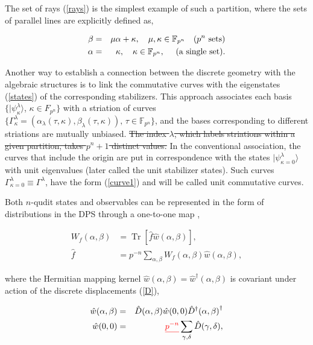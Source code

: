 \documentclass[quantumrep,article,submit,pdftex,moreauthors]{Definitions/mdpi}
\DeclareMathOperator{\Tr}{Tr}
\providecommand{\DIFadd}[1]{{\protect\color{blue}\uwave{#1}}} %
\providecommand{\DIFdel}[1]{{\protect\color{red}\sout{#1}}}                      %
\providecommand{\DIFaddbegin}{} %
\providecommand{\DIFaddend}{} %
\providecommand{\DIFdelbegin}{} %
\providecommand{\DIFdelend}{} %
\begin{document}
\DIFaddend The set of rays (\ref{rays}) is the simplest example of such a partition, where
the sets of parallel lines are explicitly defined as,

\begin{eqnarray}
  \beta
  &=& \mu \alpha + \kappa, \quad \mu, \kappa \in \mathbb{F}_{p^{n}}
  \quad \text{($p^{n}$ sets)}
  \label{rays0} \\
  \alpha
  &=& \kappa, \quad \kappa \in \mathbb{F}_{p^{n}},
  \quad \text{ (a single set).}
  \notag
\end{eqnarray}

Another way to establish a connection between the discrete geometry with the
algebraic structures is to link the commutative curves with the eigenstates
(\ref{states}) of the corresponding stabilizers. This approach associates each
basis $\{|\psi_{\kappa}^{\lambda}\rangle $, $\kappa \in F_{p^{n}}\}$ with a
striation of curves $\{\Gamma_{\kappa}^{\lambda} = \left(
\alpha_{\lambda}(\tau,\kappa),\beta_{\lambda}(\tau,\kappa)\right) ,\,\tau \in
\mathbb{F}_{p^{n}}\}$, and the bases corresponding to different striations are
mutually unbiased. \DIFdelbegin \DIFdel{The index
$\lambda$, which labels striations within a given partition, takes $p^{n}+1$
distinct values. }\DIFdelend In the conventional association, the curves that include the
origin are put in correspondence with the states $|\psi_{\kappa =
0}^{\lambda}\rangle$ with unit eigenvalues (later called the unit stabilizer
states). Such curves $\Gamma_{\kappa=0}^{\lambda} \equiv \Gamma^{\lambda}$,
have the form (\ref{curve1}) and will be called unit commutative curves. 

Both $n$-qudit states and observables can be represented in the form of
distributions in the DPS through a one-to-one map
\cite{gross,DFW2-1,DFW2-2,DFW2-3,DFW2-4},

\begin{align}
  W_{f}\left( \alpha,\beta \right)
  &= \Tr\left[ \hat{f}\hat{w}\left( \alpha,\beta \right) \right],
  \label{map} \\
  \hat{f}
  &= p^{-n}\sum_{\alpha,\beta } W_{f}(\alpha,\beta) \hat{w}(\alpha,\beta),
\end{align}

where the Hermitian mapping kernel $\hat{w}\left( \alpha,\beta \right) =
\hat{w}^{\dagger}(\alpha,\beta)$ is covariant under action of the discrete
displacements (\ref{D}), \DIFaddbegin \DIFadd{and is defined as
 
}\DIFaddend 

\begin{eqnarray}
  \hat{w}\left( \alpha,\beta \right)
  &=& \hat{D}\left( \alpha,\beta \right) 
  \hat{w}\left( 0,0\right) \hat{D}^{\dagger} \left( \alpha,\beta \right) ^{\dagger }
  \label{Ds} \\
  \hat{w}\left( 0,0\right)
  &=& \DIFdelbegin \DIFdel{p^{-n} }\DIFdelend \sum_{\gamma,\delta}\hat{D}(\gamma,\delta),
  \label{Dw0}
\end{eqnarray}
\end{document}
